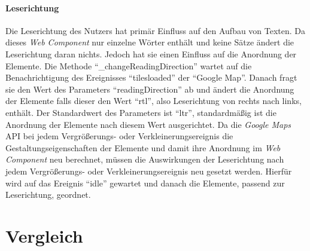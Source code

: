 \documentclass[12pt, paper=a4, bibtotoc, toc=listof, headsepline=true]{scrreprt}
\begin{document}
		\subsubsection{Leserichtung}
		Die Leserichtung des Nutzers hat primär Einfluss auf den Aufbau von Texten. Da dieses \emph{Web Component} nur einzelne Wörter enthält und keine Sätze ändert die Leserichtung daran nichts. Jedoch hat sie einen Einfluss auf die Anordnung der Elemente. Die Methode \enquote{\_changeReadingDirection} wartet auf die Benachrichtigung des Ereignisses \enquote{tilesloaded} der \enquote{Google Map}. Danach fragt sie den Wert des Parameters \enquote{readingDirection} ab und ändert die Anordnung der Elemente falls dieser den Wert \enquote{rtl}, also Leserichtung von rechts nach links, enthält. Der Standardwert des Parameters ist \enquote{ltr}, standardmäßig ist die Anordnung der Elemente nach diesem Wert ausgerichtet. Da die \emph{Google Maps} \ac{API} bei jedem Vergrößerungs- oder Verkleinerungsereignis die Gestaltungseigenschaften der Elemente und damit ihre Anordnung im \emph{Web Component} neu berechnet, müssen die Auswirkungen der Leserichtung nach jedem Vergrößerungs- oder Verkleinerungsereignis neu gesetzt werden. Hierfür wird auf das Ereignis \enquote{idle} gewartet und danach die Elemente, passend zur Leserichtung, geordnet.
		
			


\chapter{Vergleich}
	
	

	\printbibliography
\end{document}
